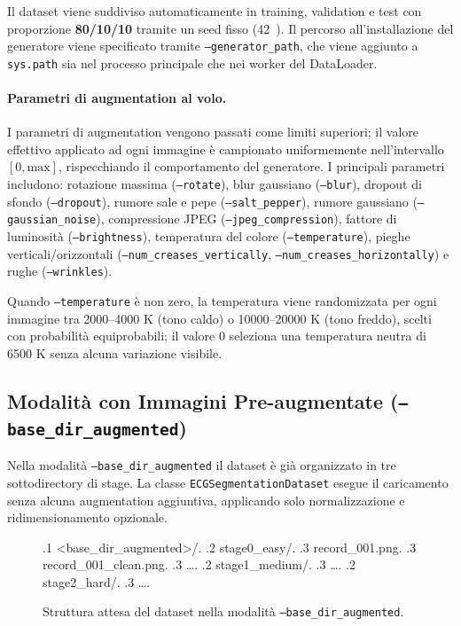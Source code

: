 Il dataset viene suddiviso automaticamente in training, validation e test con proporzione \textbf{80/10/10} tramite un seed fisso (42~\cite{adams1984hitchhiker}). Il percorso all'installazione del generatore viene specificato tramite \texttt{--generator\_path}, che viene aggiunto a \texttt{sys.path} sia nel processo principale che nei worker del DataLoader.

\paragraph{Parametri di augmentation al volo.} I parametri di augmentation vengono passati come limiti superiori; il valore effettivo applicato ad ogni immagine è campionato uniformemente nell'intervallo $[0, \text{max}]$, rispecchiando il comportamento del generatore. I principali parametri includono: rotazione massima (\texttt{--rotate}), blur gaussiano (\texttt{--blur}), dropout di sfondo (\texttt{--dropout}), rumore sale e pepe (\texttt{--salt\_pepper}), rumore gaussiano (\texttt{--gaussian\_noise}), compressione JPEG (\texttt{--jpeg\_compression}), fattore di luminosità (\texttt{--brightness}), temperatura del colore (\texttt{--temperature}), pieghe verticali/orizzontali (\texttt{--num\_creases\_vertically}, \texttt{--num\_creases\_horizontally}) e rughe (\texttt{--wrinkles}).

Quando \texttt{--temperature} è non zero, la temperatura viene randomizzata per ogni immagine tra 2000–4000 K (tono caldo) o 10000–20000 K (tono freddo), scelti con probabilità equiprobabili; il valore 0 seleziona una temperatura neutra di 6500 K senza alcuna variazione visibile.

\subsection{Modalità con Immagini Pre-augmentate (\texttt{--base\_\allowbreak{}dir\_\allowbreak{}augmented})}

Nella modalità \texttt{--base\_dir\_augmented} il dataset è già organizzato in tre sottodirectory di stage. La classe \texttt{ECGSegmentationDataset} esegue il caricamento senza alcuna augmentation aggiuntiva, applicando solo normalizzazione e ridimensionamento opzionale.

\begin{figure}[H]
\raggedright
\begin{dirtree}{%
.1 <base\_dir\_augmented>/.
.2 stage0\_easy/.
.3 record\_001.png.
.3 record\_001\_clean.png.
.3 \ldots.
.2 stage1\_medium/.
.3 \ldots.
.2 stage2\_hard/.
.3 \ldots.
}
\caption{Struttura attesa del dataset nella modalità \texttt{--base\_dir\_augmented}.}
\label{fig:extractor_augdir}
\end{dirtree}
\end{figure}

